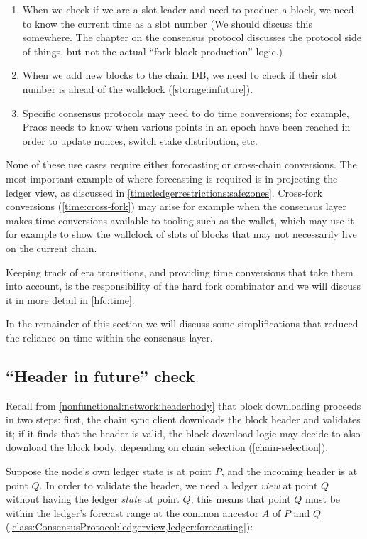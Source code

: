 \begin{enumerate}
\item When we check if we are a slot leader and need to produce a block, we
need to know the current time as a slot number (We should discuss
this somewhere. The chapter on the consensus protocol discusses the protocol
side of things, but not the actual ``fork block production'' logic.)
\item When we add new blocks to the chain DB, we need to check if their slot
number is ahead of the wallclock (\cref{storage:infuture}).
\item Specific consensus protocols may need to do time conversions; for example,
Praos needs to know when various points in an epoch have been reached in order
to update nonces, switch stake distribution, etc.
\end{enumerate}

None of these use cases require either forecasting or cross-chain conversions.
The most important example of where forecasting is required is in projecting
the ledger view, as discussed in \cref{time:ledgerrestrictions:safezones}.
Cross-fork conversions (\cref{time:cross-fork}) may arise for example when the consensus layer makes time conversions available to tooling such as the wallet,
which may use it for example to show the wallclock of slots of blocks that may
not necessarily live on the current chain.

Keeping track of era transitions, and providing time conversions that take
them into account, is the responsibility of the hard fork combinator and
we will discuss it in more detail in \cref{hfc:time}.

In the remainder of this section we will discuss some simplifications
that reduced the reliance on time within the consensus layer.

\subsection{``Header in future'' check}
\label{time:header-infuture-check}

Recall from \cref{nonfunctional:network:headerbody} that block downloading
proceeds in two steps: first, the chain sync client downloads the block header
and validates it; if it finds that the header is valid, the block download logic
may decide to also download the block body, depending on chain selection
(\cref{chain-selection}).

Suppose the node's own ledger state is at point $P$, and the incoming header is
at point $Q$. In order to validate the header, we need a ledger \emph{view} at
point $Q$ without having the ledger \emph{state} at point $Q$; this means that
point $Q$ must be within the ledger's forecast range at the common ancestor $A$
of $P$ and $Q$ (\cref{class:ConsensusProtocol:ledgerview,ledger:forecasting}):

